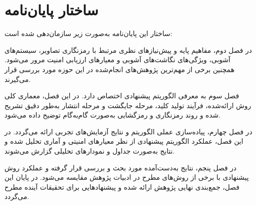 \section{ساختار پایان‌نامه}

ساختار این پایان‌نامه به‌صورت زیر سازمان‌دهی شده است:

در فصل دوم، مفاهیم پایه و پیش‌نیازهای نظری مرتبط با رمزنگاری تصاویر، سیستم‌های آشوبی، ویژگی‌های نگاشت‌های آشوبی و معیارهای ارزیابی امنیت مرور می‌شود. همچنین برخی از مهم‌ترین پژوهش‌های انجام‌شده در این حوزه مورد بررسی قرار می‌گیرند.

فصل سوم به معرفی الگوریتم پیشنهادی اختصاص دارد. در این فصل، معماری کلی روش ارائه‌شده، فرآیند تولید کلید، مرحله جایگشت و مرحله انتشار به‌طور دقیق تشریح شده و روند رمزنگاری و رمزگشایی به‌صورت گام‌به‌گام توضیح داده می‌شود.

در فصل چهارم، پیاده‌سازی عملی الگوریتم و نتایج آزمایش‌های تجربی ارائه می‌گردد. در این فصل، عملکرد الگوریتم پیشنهادی از نظر معیارهای امنیتی و آماری تحلیل شده و نتایج به‌صورت جداول و نمودارهای تحلیلی گزارش می‌شوند.

در فصل پنجم، نتایج به‌دست‌آمده مورد بحث و بررسی قرار گرفته و عملکرد روش پیشنهادی با برخی از روش‌های مطرح در ادبیات پژوهش مقایسه می‌شود. در پایان این فصل، جمع‌بندی نهایی پژوهش ارائه شده و پیشنهادهایی برای تحقیقات آینده مطرح می‌گردد.